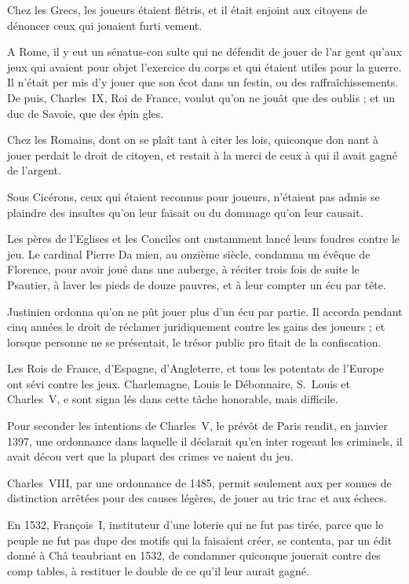 Chez les Grecs, les joueurs étaient
flétris, et il était enjoint aux citoyens
de dénoncer ceux qui jouaient furti%
vement.

A Rome, il y eut un sénatus-con
sulte qui ne défendit de jouer de l'ar%
gent qu'aux jeux qui avaient pour
objet l'exercice du corps et qui étaient
utiles pour la guerre. Il n'était per%
mis d'y jouer que son écot dans un
festin, ou des raffraîchissements. De%
puis, Charles~IX, Roi de France,
voulut qu'on ne jouât que des oublis ;
et un duc de Savoie, que des épin%
gles.

Chez les Romains, dont on se plaît
tant à citer les lois, quiconque don%
nant à jouer perdait le droit de citoyen,
et restait à la merci de ceux à qui il
avait gagné de l'argent.

Sous Cicérons, ceux qui étaient
reconnus pour joueurs, n'étaient pas
admis se plaindre des insultes qu'on
leur faisait ou du dommage qu'on leur
causait.

Les pères de l'Eglises et les Conciles
ont cnstamment lancé leurs foudres
contre le jeu. Le cardinal Pierre Da%
mien, au onzième siècle, condamna
un évêque de Florence, pour avoir
joué dans une auberge, à réciter
trois fois de suite le Psautier, à laver
les pieds de douze pauvres, et à leur
compter un écu par tête.

Justinien ordonna qu'on ne pût
jouer plus d'un écu par partie. Il
accorda pendant cinq années le droit
de réclamer juridiquement contre les
gains des joueurs ; et lorsque personne
ne se présentait, le trésor public pro%
fitait de la confiscation.

Les Rois de France, d'Espagne,
d'Angleterre, et tous les potentats
de l'Europe ont sévi contre les jeux.
Charlemagne, Louis le Débonnaire,
S.~Louis et Charles~V, e sont signa%
lés dans cette tâche honorable, mais
difficile.

Pour seconder les intentions de
Charles~V, le prévôt de Paris rendit,
en janvier 1397, une ordonnance
dans laquelle il déclarait qu'en inter%
rogeant les criminels, il avait décou%
vert que la plupart des crimes ve%
naient du jeu.

Charles~VIII, par une ordonnance
de 1485, permit seulement aux per%
sonnes de distinction arrêtées pour
des causes légères, de jouer au tric%
trac et aux échecs.

En 1532, François~I\ier, instituteur
d'une loterie qui ne fut pas tirée,
parce que le peuple ne fut pas dupe
des motifs qui la faisaient créer, se
contenta, par un édit donné à Châ%
teaubriant en 1532, de condamner
quiconque jouerait contre des comp%
tables, à restituer le double de ce
qu'il leur aurait gagné.

